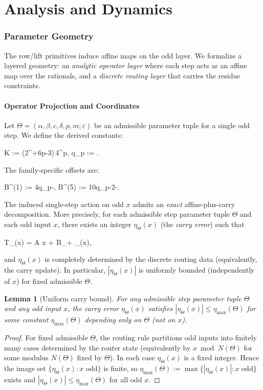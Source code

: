 \documentclass[11pt,letterpaper]{amsart}
\def\[{ }%
\def\]{ }%
\theoremstyle{definition}
\theoremstyle{plain}
\newtheorem{lemma}{Lemma}
\theoremstyle{plain}
\theoremstyle{remark}
\begin{document}
\part{Analysis and Dynamics}


\section{Parameter Geometry}
\label{sec:param-geometry}

The row/lift primitives induce affine maps on the odd layer. We formalize a layered geometry: an \emph{analytic operator layer} where each step acts as an affine map over the rationals, and a \emph{discrete routing layer} that carries the residue constraints.

\subsection{Operator Projection and Coordinates}
\label{subsec:op-projection}

Let $\Theta=(\alpha,\beta,c,\delta,p,m;\varepsilon)$ be an admissible parameter tuple for a single odd step.
We define the derived constants:
\[
K \;:=\; (2^{\alpha+6p}-3)\,4^p, \qquad q_p \;:=\; .
\]
The family-specific offsets are:
\[
B^{(1)} := 4q_p-, \qquad B^{(5)} := 10q_p-2-.
\]
The induced single-step action on odd $x$ admits an \emph{exact} affine-plus-carry decomposition.
More precisely, for each admissible step parameter tuple $\Theta$ and each odd input $x$,
there exists an integer $\eta_\Theta(x)$ (the \emph{carry error}) such that
\[
T_\Theta(x) \;=\; A x + B_\varepsilon \;+\; \eta_\Theta(x),
\]
and $\eta_\Theta(x)$ is completely determined by the discrete routing data (equivalently, the
carry update). In particular, $|\eta_\Theta(x)|$ is uniformly bounded (independently of $x$)
for fixed admissible $\Theta$.

\begin{lemma}[Uniform carry bound]
\label{lem:uniform-carry-bound}
For any admissible step parameter tuple $\Theta$ and any odd input $x$, the carry error
$\eta_\Theta(x)$ satisfies $|\eta_\Theta(x)|\le \eta_{\max}(\Theta)$ for some constant
$\eta_{\max}(\Theta)$ depending only on $\Theta$ (not on $x$).
\end{lemma}

\begin{proof}
For fixed admissible $\Theta$, the routing rule partitions odd inputs into finitely many
cases determined by the router state (equivalently by $x\bmod N(\Theta)$ for some modulus
$N(\Theta)$ fixed by $\Theta$). In each case $\eta_\Theta(x)$ is a fixed integer.
Hence the image set $\{\eta_\Theta(x): x \text{ odd}\}$ is finite, so
$\eta_{\max}(\Theta):=\max\{|\eta_\Theta(x)|: x \text{ odd}\}$ exists and
$|\eta_\Theta(x)|\le \eta_{\max}(\Theta)$ for all odd $x$.
\end{proof}
\end{document}

